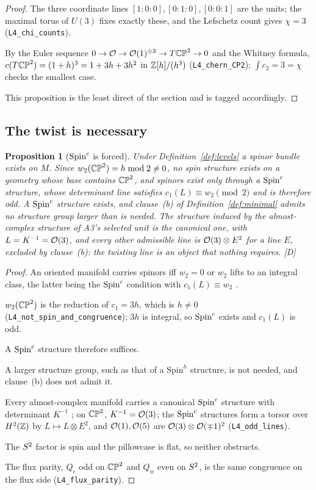 \documentclass[11pt,a4paper]{article}
\theoremstyle{plain}
\newtheorem{proposition}[theorem]{Proposition}
\theoremstyle{definition}
\theoremstyle{remark}
\newcommand{\rigD}{[\textup{D}]}
\begin{document}
\begin{proof}
The three coordinate lines $[1{:}0{:}0],[0{:}1{:}0],[0{:}0{:}1]$ are the units; the maximal torus of $U(3)$ fixes exactly these, and the Lefschetz count gives $\chi=3$ (\texttt{L4\_chi\_counts}).

By the Euler sequence $0\to\mathcal{O}\to\mathcal{O}(1)^{\oplus3}\to T\mathbb{CP}^2\to0$ and the Whitney formula, $c(T\mathbb{CP}^2)=(1+h)^{3}=1+3h+3h^{2}$ in $\mathbb{Z}[h]/(h^{3})$ \cite{GriffithsHarris} (\texttt{L4\_chern\_CP2}); $\int c_{2}=3=\chi$ checks the smallest case.

This proposition is the least direct of the section and is tagged accordingly.
\end{proof}

\subsection{The twist is necessary}

\begin{proposition}[$\text{Spin}^c$ is forced]\label{prop:spinc}
Under Definition~\ref{def:levels} a spinor bundle exists on $M$. Since $w_{2}(\mathbb{CP}^2)=h\bmod2\neq0$, no spin structure exists on a geometry whose base contains $\mathbb{CP}^2$, and spinors exist only through a $\text{Spin}^c$ structure, whose determinant line satisfies $c_{1}(L)\equiv w_{2}\pmod2$ and is therefore odd. A $\text{Spin}^c$ structure exists, and clause~(b) of Definition~\ref{def:minimal} admits no structure group larger than is needed. The structure induced by the almost-complex structure of A3's selected unit is the canonical one, with $L=K^{-1}=\mathcal{O}(3)$, and every other admissible line is $\mathcal{O}(3)\otimes E^{2}$ for a line $E$, excluded by clause~(b): the twisting line is an object that nothing requires. \rigD
\end{proposition}

\begin{proof}
An oriented manifold carries spinors iff $w_{2}=0$ or $w_{2}$ lifts to an integral class, the latter being the $\text{Spin}^c$ condition with $c_{1}(L)\equiv w_{2}$ \cite{LawsonMichelsohn}.

$w_{2}(\mathbb{CP}^2)$ is the reduction of $c_{1}=3h$, which is $h\neq0$ (\texttt{L4\_not\_spin\_and\_congruence}); $3h$ is integral, so $\text{Spin}^c$ exists and $c_{1}(L)$ is odd.

A $\text{Spin}^c$ structure therefore suffices.

A larger structure group, such as that of a $\mathrm{Spin}^{h}$ structure, is not needed, and clause~(b) does not admit it.

Every almost-complex manifold carries a canonical $\text{Spin}^c$ structure with determinant $K^{-1}$ \cite{LawsonMichelsohn,Friedrich}; on $\mathbb{CP}^2$, $K^{-1}=\mathcal{O}(3)$; the $\text{Spin}^c$ structures form a torsor over $H^{2}(\mathbb{Z})$ by $L\mapsto L\otimes E^{2}$, and $\mathcal{O}(1),\mathcal{O}(5)$ are $\mathcal{O}(3)\otimes\mathcal{O}(\mp1)^{2}$ (\texttt{L4\_odd\_lines}).

The $S^2$ factor is spin and the pillowcase is flat, so neither obstructs.

The flux parity, $Q_{c}$ odd on $\mathbb{CP}^2$ and $Q_{w}$ even on $S^2$, is the same congruence on the flux side (\texttt{L4\_flux\_parity}).
\end{proof}
\end{document}
